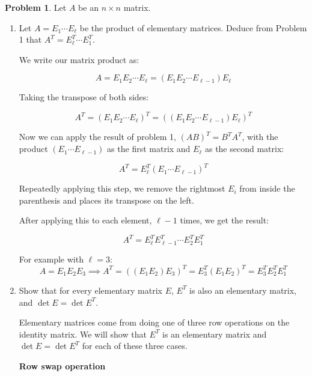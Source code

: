 \documentclass[12pt, oneside]{amsart}
\theoremstyle{definition}
\newtheorem{prob}{Problem}
\begin{document}
\begin{prob} Let $A$ be an $n\times n$ matrix. 
    \begin{enumerate}
    \item Let $A = E_1\cdots E_\ell$ be the product of elementary matrices. Deduce from Problem 1 that $A^T = E_\ell^T \cdots E_1^T$.
    
    \begin{solution}
    
    
    We write our matrix product as: 
    
    \[
    A = E_1 E_2 \cdots E_\ell = (E_1 E_2 \cdots E_{\ell-1}) E_\ell
    \]

    Taking the transpose of both sides:
    
    \[
      A^T = (E_1 E_2 \cdots E_\ell)^T = ((E_1 E_2 \cdots E_{\ell-1}) E_\ell)^T
    \]
    
    Now we can apply the result of problem 1, $(AB)^T = B^T A^T$, with the product $(E_1 \cdots E_{\ell-1})$ as the first matrix and $E_\ell$ as the second matrix:
    
    
    \[
      A^T = E_\ell^T (E_1 \cdots E_{\ell-1})^T
    \]
    
    Repeatedly applying this step, we remove the rightmost $E_i$ from inside the parenthesis and places its transpose on the left. 

    After applying this to each element, $\ell-1$ times, we get the result:

    \[
      A^T = E_\ell^T E_{\ell-1}^T \cdots E_2^T E_1^T
    \]
    
    For example with $\ell = 3$:
    \[
      A = E_1 E_2 E_3 \implies A^T = ((E_1 E_2) E_3)^T = E_3^T (E_1 E_2)^T = E_3^T E_2^T E_1^T
    \]
    \end{solution}
    
    \item Show that for every elementary matrix $E$, $E^T$ is also an elementary matrix, and $\det E = \det E^T$.
    
    \begin{solution}
    
    Elementary matrices come from doing one of three row operations on the identity matrix. We will show that $E^T$ is an elementary matrix and $\det E = \det E^T$ for each of these three cases.
    
    \vspace{0.3cm}
    
    \textbf{Row swap operation}
    

\end{solution}
\end{enumerate}
\end{prob}
\end{document}
